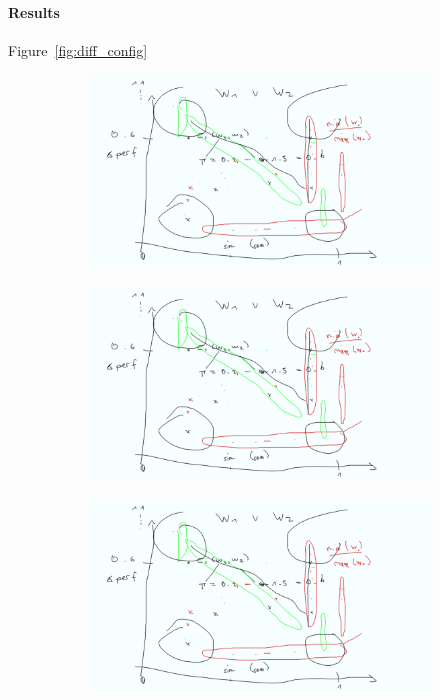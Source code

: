 \paragraph*{Results} {\color{red} Figure~\ref{fig:diff_config}}
\begin{figure}
	\centering
	\begin{subfigure}{0.33\textwidth}
		\centering
		\includegraphics[width=\linewidth]{images/mockup.png}
		\caption{\batik}
	\end{subfigure}
	\begin{subfigure}{0.33\textwidth}
		\centering
		\includegraphics[width=\linewidth]{images/mockup.png}
		\caption{\dconvert}
	\end{subfigure}
	\begin{subfigure}{0.33\textwidth}
		\centering
		\includegraphics[width=\linewidth]{images/mockup.png}

\end{subfigure}
\end{figure}
